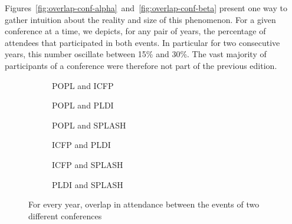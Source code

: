 Figures~\ref{fig:overlap-conf-alpha}~and~\ref{fig:overlap-conf-beta} present one
way to gather intuition about the reality and size of this phenomenon. For a
given conference at a time, we depicts, for any pair of years, the percentage of
attendees that participated in both events. In particular for two consecutive
years, this number oscillate between 15\% and 30\%. The vast majority of
participants of a conference were therefore not part of the previous edition.


\begin{figure}
  \centering
  \begin{subfigure}[b]{0.3\textwidth}
    \centering
    \caption{POPL and ICFP}
  \end{subfigure}
  \begin{subfigure}[b]{0.3\textwidth}
    \centering
    \caption{POPL and PLDI}
  \end{subfigure}
  \begin{subfigure}[b]{0.3\textwidth}
    \centering
    \caption{POPL and SPLASH}
  \end{subfigure}
  \begin{subfigure}[b]{0.3\textwidth}
    \centering
    \caption{ICFP and PLDI}
  \end{subfigure}
  \begin{subfigure}[b]{0.3\textwidth}
    \centering
    \caption{ICFP and SPLASH}
  \end{subfigure}
  \begin{subfigure}[b]{0.3\textwidth}
    \centering
    \caption{PLDI and SPLASH}
  \end{subfigure}
   \caption{For every year, overlap in attendance between the events of two
     different conferences}
  \label{fig:overlap-cross}
\end{figure}

